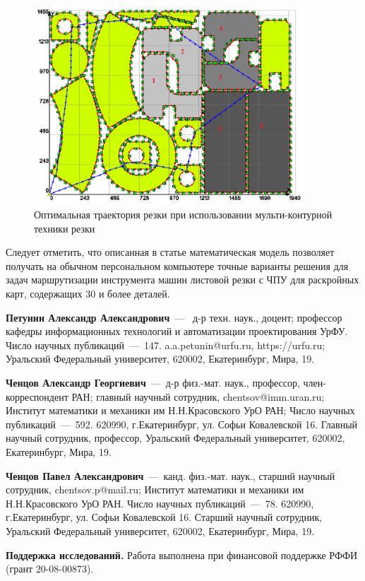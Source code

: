 \documentclass[10pt]{SPIIRAS_Proceedings}
\begin{document}
\begin{figure}[]
  \centering
  \includegraphics[width=0.9\textwidth]{cut19.png}
  \caption{Оптимальная траектория резки при использовании мульти-контурной техники резки}
  \label{fig:2}
\end{figure}

Следует отметить,
что описанная в статье математическая модель позволяет получать
на обычном персональном компьютере точные варианты решения
для задач маршрутизации инструмента машин листовой резки с ЧПУ
для раскройных карт,
содержащих 30 и более деталей.

\printbibliography[title=Литература]

\begin{aboutAuthors}

\textbf{Петунин Александр Александрович}~---~
д-р техн. наук., доцент;
профессор кафедры информационных технологий и автоматизации проектирования УрФУ.
Число научных публикаций~---~147.
a.a.petunin@urfu.ru,
https://urfu.ru;
Уральский Федеральный университет,
620002, Екатеринбург, Мира, 19.
\smallskip

\textbf{Ченцов Александр Георгиевич}~---~д-р физ.-мат. наук., профессор, член-корреспондент РАН;
главный научный сотрудник, chentsov@imm.uran.ru; Институт математики и механики им Н.Н.Красовского УрО РАН;
Число научных публикаций~---~592.
620990, г.Екатеринбург,
ул. Софьи Ковалевской 16.
Главный научный сотрудник, профессор, Уральский Федеральный университет,
620002, Екатеринбург, Мира, 19.

\smallskip

\textbf{Ченцов Павел Александрович}~---~канд. физ.-мат. наук., старший научный сотрудник, chentsov.p@mail.ru; Институт математики и механики им Н.Н.Красовского УрО РАН.
Число научных публикаций~---~78.
620990, г.Екатеринбург,
ул. Софьи Ковалевской 16.
Старший научный сотрудник,
Уральский Федеральный университет,
620002, Екатеринбург, Мира, 19.
\smallskip

\textbf{Поддержка исследований.}
Работа выполнена при финансовой поддержке РФФИ (грант 20-08-00873).

\end{aboutAuthors}
\end{document}
